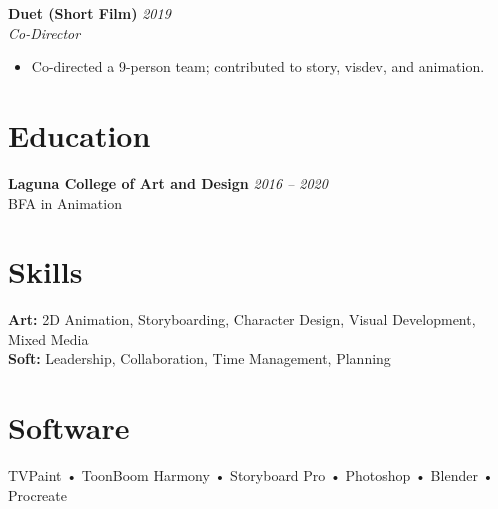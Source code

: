 \documentclass[11pt,letterpaper]{article}
\begin{document}
\textbf{Duet (Short Film)} \hfill \textit{2019}\\

\textit{Co-Director}

\begin{itemize}

    \item Co-directed a 9-person team; contributed to story, visdev, and animation.

\end{itemize}




\section{Education}



\textbf{Laguna College of Art and Design} \hfill \textit{2016 -- 2020}\\

BFA in Animation




\section{Skills}



\textbf{Art:} 2D Animation, Storyboarding, Character Design, Visual Development, Mixed Media \\

\textbf{Soft:} Leadership, Collaboration, Time Management, Planning




\section{Software}



TVPaint • ToonBoom Harmony • Storyboard Pro • Photoshop • Blender • Procreate
\end{document}
